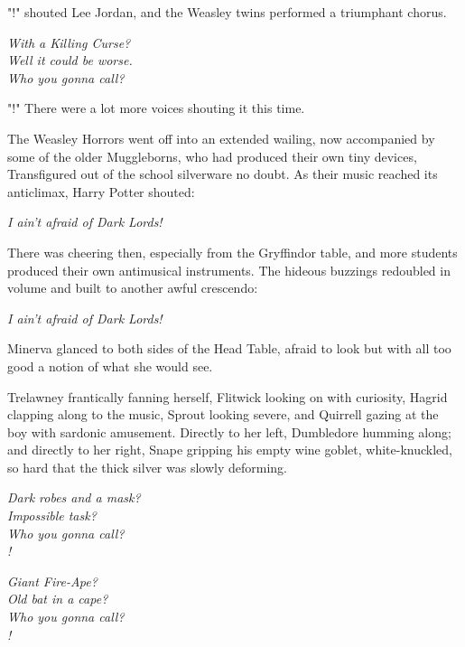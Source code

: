"!" shouted Lee Jordan, and the Weasley twins performed a
triumphant chorus.

\begin{center}
\emph{With a Killing Curse?\\
Well it could be worse.\\
Who you gonna call?}
\end{center}

"!" There were a lot more voices shouting it this time.

The Weasley Horrors went off into an extended wailing, now accompanied by some
of the older Muggleborns, who had produced their own tiny devices, Transfigured
out of the school silverware no doubt. As their music reached its anticlimax,
Harry Potter shouted:

\begin{center}
\emph{I ain't afraid of Dark Lords!}
\end{center}

There was cheering then, especially from the Gryffindor table, and more
students produced their own antimusical instruments. The hideous buzzings
redoubled in volume and built to another awful crescendo:

\begin{center}
\emph{I ain't afraid of Dark Lords!}
\end{center}

Minerva glanced to both sides of the Head Table, afraid to look but with all
too good a notion of what she would see.

Trelawney frantically fanning herself, Flitwick looking on with curiosity,
Hagrid clapping along to the music, Sprout looking severe, and Quirrell gazing
at the boy with sardonic amusement. Directly to her left, Dumbledore humming
along; and directly to her right, Snape gripping his empty wine goblet,
white-knuckled, so hard that the thick silver was slowly deforming.

\begin{center}
\emph{Dark robes and a mask?\\
Impossible task?\\
Who you gonna call?\\
!}

\emph{Giant Fire-Ape?\\
Old bat in a cape?\\
Who you gonna call?\\
!}
\end{center}

